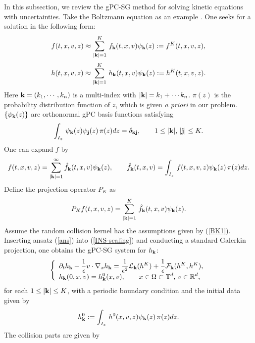 \documentclass[final,onefignum,onetabnum]{siamart171218}
\newcounter{example}
\def\bk{{\bf{k}}}
\def\bj{{\bf{j}}}
\begin{document}
In this subsection, we review the gPC-SG method for solving kinetic equations with uncertainties.
Take the Boltzmann equation as an example \cite{Hu}. One seeks for a solution in the following form:
\begin{align}
&\displaystyle  f(t,x,v,z)\approx \sum_{|\bk|=1}^{K}\, f_{\bk}(t,x,v)\psi_{\bk}(z) := f^K(t,x,v,z), \notag\\[2pt]
&\displaystyle \label{ans} h(t,x,v,z)\approx \sum_{|\bk|=1}^{K}\, h_{\bk}(t,x,v)\psi_{\bk}(z) := h^K(t,x,v,z).
\end{align}
Here $\bk=(k_1, \cdots, k_n)$ is a multi-index with $|\bk|=k_1+\cdots k_n$. $\pi(z)$ is the probability distribution function of $z$, which is given
{\it a priori} in our problem.
$\{\psi_{\bk}(z)\}$ are orthonormal gPC basis functions satisfying
$$\int_{I_z}\, \psi_{\bk}(z)\psi_{\bj}(z)\, \pi(z)dz=\delta_{\bk\bj}, \qquad 1\leq |\bk|, \, |\bj|\leq K. $$
One can expand $f$ by
$$f(t,x,v,z)=\sum_{|\bk|=1}^{\infty} \hat f_{\bk}(t,x,v)\psi_{\bk}(z), \qquad \hat f_{\bk}(t,x,v)=\int_{I_z}\, f(t,x,v,z)\psi_{\bk}(z)\,\pi(z)dz. $$
Define the projection operator $P_{K}$ as
\begin{equation}\label{proj} P_{K} f(t,x,v,z)=\sum_{|\bk|=1}^K\, \hat f_{\bk}(t,x,v)\psi_{\bk}(z). \end{equation}
Assume the random collision kernel has the assumptions given by (\ref{BK1}).
Inserting ansatz (\ref{ans}) into (\ref{INS-scaling})  and conducting a standard Galerkin projection, one obtains the gPC-SG
system for $h_{\bk}$:
\begin{align}
\label{h_gPC1}
\left\{
\begin{array}{l}
\displaystyle \partial_t h_{\bk} + \frac{1}{\epsilon}v\cdot\nabla_x h_{\bk} =\frac{1}{\epsilon^2}\mathcal L_{\bk}(h^K) +
\frac{1}{\epsilon}\mathcal F_{\bk}(h^K, h^K),
\\[2pt]
\displaystyle  h_{\bk}(0,x,v)=h_{\bk}^{0}(x,v), \qquad x\in\Omega\subset\mathbb T^d,  \, v\in \mathbb R^d,
\end{array}\right.
\end{align}
for each $1\leq |\bk|\leq K$, with a periodic boundary condition and the initial data given by
$$h_{\bk}^{0} := \int_{I_z}\, h^{0}(x,v,z)\psi_{\bk}(z)\, \pi(z)dz. $$
The collision parts are given by
\end{document}
